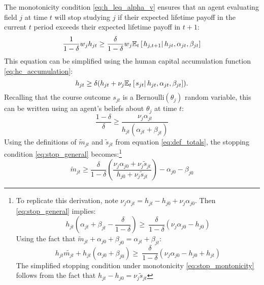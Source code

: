 \documentclass[11 pt]{article}
\newcommand{\toedit}[1]{{\color{gray}#1}}
\newcommand{\toedit}[1]{#1}
\newcommand{\pr}[1]{\left( #1 \right)}
\newcommand{\study}{m} %
\newcommand{\pass}{s}
\begin{document}
The monotonicity condition \eqref{eq:h_leq_alpha_v} ensures that an agent evaluating field $j$ at time $t$ will stop studying $j$ if their expected lifetime payoff in the current $t$ period exceeds their expected lifetime payoff in $t+1$:
\begin{equation*}
    \frac{1}{1 - \delta} w_j h_{jt} 
    \geq 
    \frac{\delta}{1 - \delta} w_j \mathbb{E}_t \left[\left. h_{j,t+1} \right\vert h_{jt}, \alpha_{jt}, \beta_{jt} \right]
\end{equation*}
This equation can be simplified using the human capital accumulation function \eqref{eq:hc_accumulation}:
\begin{equation*}
    h_{jt} \geq \delta (h_{jt} + \nu_j \mathbb{E}_t \left[\left. s_{jt} \right\vert h_{jt}, \alpha_{jt}, \beta_{jt}\right]).
\end{equation*}
Recalling that the course outcome $s_{jt}$ is a $\text{Bernoulli} (\theta_j)$ random variable, this can be written using an agent's beliefs about $\theta_j$ at time $t$:
\begin{equation}\label{eq:stop_general}
    \frac{1 - \delta}{\delta} \geq \frac{\nu_j \alpha_{jt}}{h_{jt} (\alpha_{jt} + \beta_{jt})}
\end{equation}
Using the definitions of $\tilde{\study}_{jt}$ and $\tilde{\pass}_{jt}$ from equation \eqref{eq:def_totals}, the stopping condition \eqref{eq:stop_general} becomes:\footnote{
    To replicate this derivation, note $\nu_j \alpha_{jt} = h_{jt} - h_{j0} + \nu_j \alpha_{j0}$. 
    Then \eqref{eq:stop_general} implies:
    \begin{equation*}
        h_{jt} \pr{\alpha_{jt} + \beta_{jt} - \frac{\delta}{1 - \delta}} 
        \geq \
        \frac{\delta}{1 - \delta} \pr{\nu_j \alpha_{j0} - h_{j0}}
    \end{equation*}
    Using the fact that $\tilde{\study}_{jt} + \alpha_{j0} + \beta_{j0} = \alpha_{jt} + \beta_{jt}$:
    \begin{equation*}
        h_{jt} \tilde{\study_{jt}}
        + h_{jt} \pr{\alpha_{j0} + \beta_{j0}} 
        \geq \
        \frac{\delta}{1 - \delta} \pr{\nu_j \alpha_{j0} - h_{j0} + h_{jt}}
    \end{equation*}
    The simplified stopping condition under monotonicity \eqref{eq:stop_montonicity} follows from the fact that $h_{jt} - h_{j0} = \nu_j \tilde{\pass}_{jt}$
}
\begin{equation}\label{eq:stop_montonicity}
    \tilde{\study}_{jt} \geq \frac{\delta}{1 - \delta}
    \pr{
        \frac{\nu_j \alpha_{j0} + \nu_j \tilde{\pass}_{jt}}{h_{j0} + \nu_j \tilde{\pass}_{jt}}
    } - \alpha_{j0} - \beta_{j0}
\end{equation}
\end{document}
